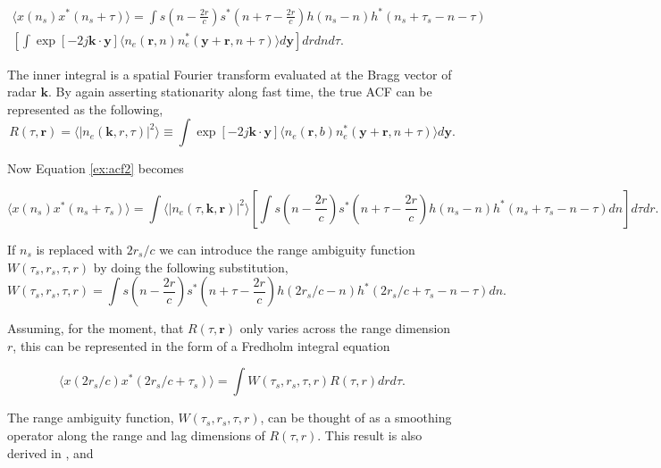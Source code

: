  \begin{multline}
 \label{ex:acf2}
 \langle x(n_s)x^*(n_s+\tau)\rangle = \int s\left(n-\frac{2r}{c}\right)s^*\left(n+\tau -\frac{2r}{c}\right) h(n_s-n)h^*(n_s+\tau_s-n-\tau) \\\left[\int \exp\left[-2j \mathbf{k}\cdot \mathbf{y}\right] \langle n_e(\mathbf{r},n)n^*_e(\mathbf{y}+\mathbf{r},n+\tau)\rangle d\mathbf{y} \right]drdn d\tau.
 \end{multline}

The inner integral is a spatial Fourier transform evaluated at the Bragg vector of radar $\mathbf{k}$. By again asserting stationarity along fast time, the true ACF can be represented as the following,
 \begin{equation}
 \label{eq:spft}
R(\tau,\mathbf{r})= \langle |n_e(\mathbf{k},r,\tau)|^2\rangle \equiv  \int \exp\left[-2j \mathbf{k}\cdot \mathbf{y} \right] \langle n_e(\mathbf{r},b)n^*_e(\mathbf{y}+\mathbf{r},n+\tau)\rangle d\mathbf{y}.
 \end{equation}
 
 \noindent Now Equation \ref{ex:acf2} becomes
 
 \begin{equation}
 \langle x(n_s)x^*(n_s+\tau_s)\rangle = \int \langle |n_e(\tau,\mathbf{k},\mathbf{r})|^2\rangle\left[\int s(n-\frac{2r}{c})s^*(n+\tau -\frac{2r}{c})h(n_s-n)h^*(n_s+\tau_s-n-\tau) dn \right]d\tau dr.
 \end{equation}

 If $n_s$ is replaced with $2r_s/c$ we can introduce the range ambiguity function $W(\tau_s,r_s,\tau,r)$ by doing the following substitution,
 \begin{equation}
 \label{eqn:rngamb}
 W(\tau_s,r_s,\tau,r)= \int s(n-\frac{2r}{c})s^*(n+\tau -\frac{2r}{c})h(2r_s/c-n)h^*(2r_s/c+\tau_s-n-\tau) dn.
 \end{equation}
 
Assuming, for the moment, that $R(\tau,\mathbf{r})$ only varies across the range dimension $r$, this can be represented in the form of a Fredholm integral equation
 
 \begin{equation}
 \label{eqn:fredfirst}
 \langle x(2r_s/c)x^*(2r_s/c+\tau_s)\rangle = \int W(\tau_s,r_s,\tau,r)R(\tau,r) drd\tau.
 \end{equation}
 
\noindent The range ambiguity function, $W(\tau_s,r_s,\tau,r)$, can be thought of as a smoothing operator along the range and lag dimensions of $R(\tau,r)$. This result is also derived in \cite{nikoukar2008}, \cite{Woodman:1991is} and \cite{hysell2008}

